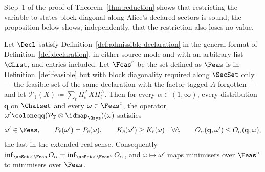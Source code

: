 
Step~1 of the proof of Theorem~\ref{thm:reduction} shows that restricting the
variable to states block diagonal along Alice's declared sectors is sound; the
proposition below shows, independently, that the restriction also loses no
value.

\begin{proposition}
\label{prop:a-neutral}
Let $\Decl$ satisfy Definition~\ref{def:admissible-declaration} in the general format of
Definition~\ref{def:declaration}, in either source mode and with an arbitrary
list $\CList$,  and  entries included.
Let $\Feas^{\circ}$ be the set defined as $\Feas$ is in
Definition~\ref{def:feasible} but with block diagonality required along
$\SecSet$ only --- the feasible set of the same declaration with the factor
tagged $A$ forgotten --- and let
$\mathcal{P}_{\mathbb{T}}(X)\coloneqq\sum_{t}\Pi^{A}_tX\Pi^{A}_t$. Then for
every $\alpha\in(1,\infty)$, every distribution $\mathbf q$ on $\Chatset$ and
every $\omega\in\Feas^{\circ}$, the operator
$\omega'\coloneqq(\mathcal{P}_{\mathbb{T}}\otimes\idmap_{\Qsys})(\omega)$
satisfies
\begin{equation}\label{eq:a-neutral}
  \omega'\in\Feas,\qquad
  P_{\hat c}(\omega')=P_{\hat c}(\omega),\qquad
  K_{\hat c}(\omega')\ge K_{\hat c}(\omega)\quad\forall\hat c,\qquad
  O_{\alpha}(\mathbf q,\omega')\le O_{\alpha}(\mathbf q,\omega),
\end{equation}
the last in the extended-real sense. Consequently
$\inf_{\acSet\times\Feas}O_{\alpha}=\inf_{\acSet\times\Feas^{\circ}}O_{\alpha}$,
and $\omega\mapsto\omega'$ maps minimisers over $\Feas^{\circ}$ to minimisers
over $\Feas$.
\end{proposition}

